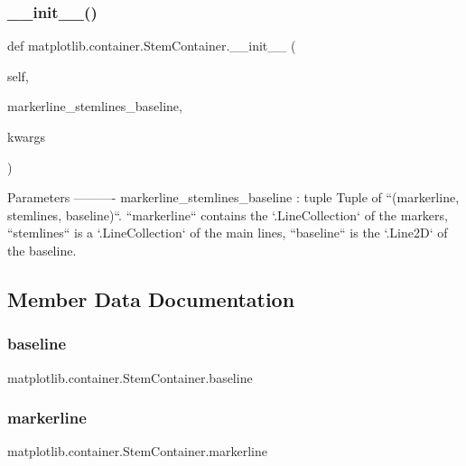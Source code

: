 \subsubsection{\texorpdfstring{\+\_\+\+\_\+init\+\_\+\+\_\+()}{\_\_init\_\_()}}
{\footnotesize\ttfamily def matplotlib.\+container.\+Stem\+Container.\+\_\+\+\_\+init\+\_\+\+\_\+ (\begin{DoxyParamCaption}\item[{}]{self,  }\item[{}]{markerline\+\_\+stemlines\+\_\+baseline,  }\item[{}]{kwargs }\end{DoxyParamCaption})}

\begin{DoxyVerb}Parameters
----------
markerline_stemlines_baseline : tuple
    Tuple of ``(markerline, stemlines, baseline)``.
    ``markerline`` contains the `.LineCollection` of the markers,
    ``stemlines`` is a `.LineCollection` of the main lines,
    ``baseline`` is the `.Line2D` of the baseline.
\end{DoxyVerb}
 

\subsection{Member Data Documentation}
\mbox{\label{classmatplotlib_1_1container_1_1StemContainer_ae065c5f71a87b080bdbe15320f144eae}} 
\subsubsection{\texorpdfstring{baseline}{baseline}}
{\footnotesize\ttfamily matplotlib.\+container.\+Stem\+Container.\+baseline}

\mbox{\label{classmatplotlib_1_1container_1_1StemContainer_a0505bcfecff8a468c6cf9eacfb82440d}} 
\subsubsection{\texorpdfstring{markerline}{markerline}}
{\footnotesize\ttfamily matplotlib.\+container.\+Stem\+Container.\+markerline}

